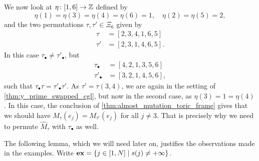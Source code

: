 \begin{example}
	We now look at $\eta \colon [1,6] \to \mathbb{Z}$ defined by
	\begin{equation*}
		\eta(1) = \eta(3) = \eta(4) = \eta(6) = 1, \quad \eta(2) = \eta(5) = 2,
	\end{equation*}
	and the two permutations $\tau, \tau' \in \Xi_6$ given by
	\begin{align*}
		\tau  & = [2,3,4,1,6,5]  \\
		\tau' & = [2,3,1,4,6,5].
	\end{align*}
	In this case $\tau_\bullet \neq \tau'_\bullet$, but
	\begin{align*}
		\tau_\bullet  & = [4,2,1,3,5,6]  \\
		\tau'_\bullet & = [3,2,1,4,5,6],
	\end{align*}
	such that $\tau_\bullet \tau = \tau'_\bullet \tau'$. As $\tau' = \tau (3,4)$, we are
	again in the setting of \cref{thm:y_prime_swapped_cgl}, but now in the second case, as
	$\eta(3) = 1 = \eta(4)$. In this case, the conclusion of
	\cref{thm:almost_mutation_toric_frame} gives that we should have $M_\tau (e_j) =
		M_{\tau'}(e_j)$ for all $j \neq 3$. That is precisely why we need to permute
	$\widehat{M}_\tau$ with $\tau_\bullet$ as well.
\end{example}

The following lemma, which we will need later on, justifies the observations made in
the examples. Write $\mathbf{ex} = \{j \in [1, N] \mid s(j) \neq + \infty\}$.

